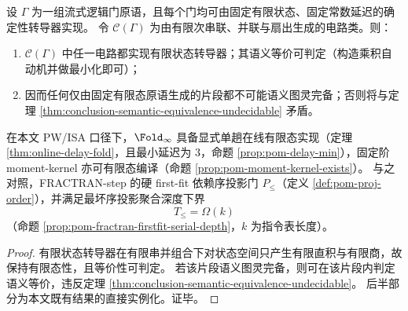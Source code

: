 \begin{theorem}[有限态门系片段的可判定性与序门的结构地位]\label{thm:conclusion-finite-state-gate-fragment-decidable-order-gate-role}
设 \(\Gamma\) 为一组流式逻辑门原语，且每个门均可由固定有限状态、固定常数延迟的确定性转导器实现。
令 \(\mathcal C(\Gamma)\) 为由有限次串联、并联与扇出生成的电路类。则：
\begin{enumerate}
  \item \(\mathcal C(\Gamma)\) 中任一电路都实现有限状态转导器；其语义等价可判定（构造乘积自动机并做最小化即可）；
  \item 因而任何仅由固定有限态原语生成的片段都不可能语义图灵完备；否则将与定理 \ref{thm:conclusion-semantic-equivalence-undecidable} 矛盾。
\end{enumerate}
在本文 PW/ISA 口径下，\(\Fold_\infty\) 具备显式单趟在线有限态实现（定理 \ref{thm:online-delay-fold}，且最小延迟为 3，命题 \ref{prop:pom-delay-min}），固定阶 moment-kernel 亦可有限态编译（命题 \ref{prop:pom-moment-kernel-exists}）。
与之对照，FRACTRAN-step 的硬 first-fit 依赖序投影门 \(P_{\le}\)（定义 \ref{def:pom-proj-order}），并满足最坏序投影聚合深度下界
\[
T_{\le}=\Omega(k)
\]
（命题 \ref{prop:pom-fractran-firstfit-serial-depth}，\(k\) 为指令表长度）。
\end{theorem}
\begin{proof}
有限状态转导器在有限串并组合下对状态空间只产生有限直积与有限商，故保持有限态性，且等价性可判定。
若该片段语义图灵完备，则可在该片段内判定语义等价，违反定理 \ref{thm:conclusion-semantic-equivalence-undecidable}。
后半部分为本文既有结果的直接实例化。证毕。
\end{proof}

